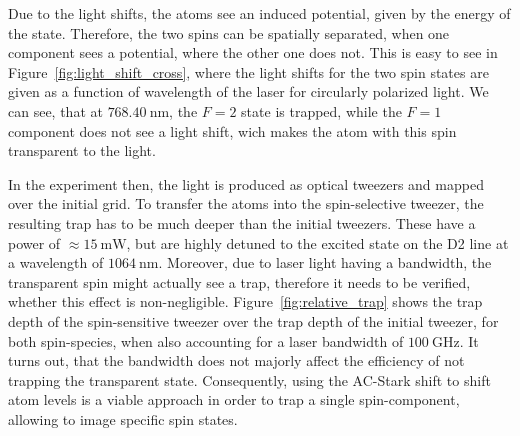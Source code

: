 Due to the light shifts, the atoms see an induced potential, given by the energy of the state. Therefore, the two spins can be spatially separated, when one component sees a potential, where the other one does not. This is easy to see in Figure~\ref{fig:light_shift_cross}, where the light shifts for the two spin states are given as a function of wavelength of the laser for circularly polarized light. We can see, that at $\SI{768.40}{\nano\meter}$, the $F=2$ state is trapped, while the $F=1$ component does not see a light shift, wich makes the atom with this spin transparent to the light.

\begin{figure}[t]%
%
\end{figure}%

In the experiment then, the light is produced as optical tweezers and mapped over the initial grid. To transfer the atoms into the spin-selective tweezer, the resulting trap has to be much deeper than the initial tweezers. These have a power of $\approx\SI{15}{\milli\watt}$, but are highly detuned to the excited state on the D2 line at a wavelength of $\SI{1064}{\nano\meter}$. Moreover, due to laser light having a bandwidth, the transparent spin might actually see a trap, therefore it needs to be verified, whether this effect is non-negligible. Figure~\ref{fig:relative_trap} shows the trap depth of the spin-sensitive tweezer over the trap depth of the initial tweezer, for both spin-species, when also accounting for a laser bandwidth of $\SI{100}{\giga\hertz}$. It turns out, that the bandwidth does not majorly affect the efficiency of not trapping the transparent state. Consequently, using the AC-Stark shift to shift atom levels is a viable approach in order to trap a single spin-component, allowing to image specific spin states.


